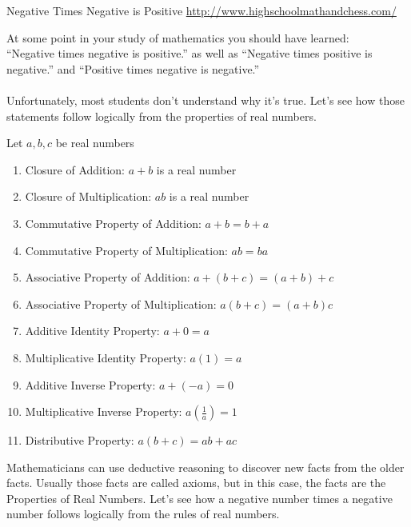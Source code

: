\documentclass[11pt]{article}
\begin{document}
\begin{center}
\Huge{Negative Times Negative is Positive}
\large{\href{www.highscoolmathandchess.com}{http://www.highschoolmathandchess.com/}}
\end{center}
At some point in your study of mathematics you should have learned:\\
``Negative times negative is positive.'' as well as
``Negative times positive is negative.'' and
``Positive times negative is negative.''\\\\
Unfortunately, most students don't understand why it's true. Let's see how 
those statements follow logically from the properties of real numbers.

\begin{tcolorbox}[skin=beamer,beamer,colback=white,colframe=red!55!black,adjusted title=Properties of Real Numbers]
Let $a, b, c$ be real numbers 
\begin{enumerate}
\item Closure of Addition: $a+b$ is a real number
\item Closure of Multiplication: $ab$ is a real number
\item Commutative Property of Addition: $a+b=b+a$
\item Commutative Property of Multiplication: $ab=ba$
\item Associative Property of Addition: $a+(b+c)=(a+b)+c$
\item Associative Property of Multiplication: $a(b+c)=(a+b)c$
\item Additive Identity Property: $a+0=a$
\item Multiplicative Identity Property: $a(1)=a$
\item Additive Inverse Property: $a+(-a)=0$
\item Multiplicative Inverse Property: $a\left(\frac{1}{a}\right)=1$
\item Distributive Property: $a(b+c)=ab+ac$
\end{enumerate}
\end{tcolorbox}

Mathematicians can use deductive reasoning to discover new facts 
from the older facts. Usually those facts are called 
axioms, but in this case, the facts are the Properties of Real Numbers. 
Let's see how a negative number times a negative number follows logically 
from the rules of real numbers.
\end{document}
